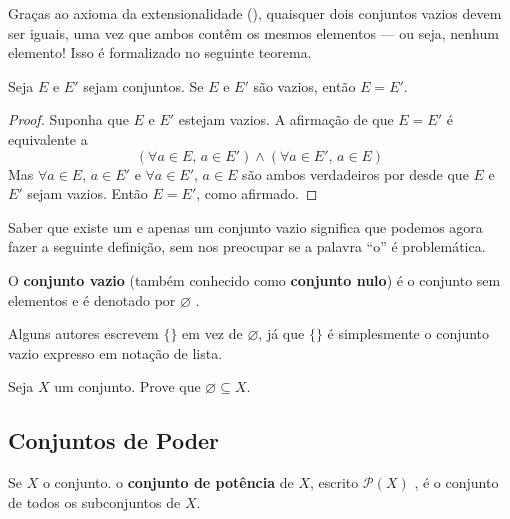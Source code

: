 Graças ao axioma da extensionalidade (), quaisquer dois conjuntos vazios devem ser iguais, uma vez que ambos contêm os mesmos elementos --- ou seja, nenhum elemento! Isso é formalizado no seguinte teorema.

\begin{theorem}
\label{thmEmptySetIsUnique}
Seja $E$ e $E'$ sejam conjuntos. Se $E$ e $E'$ são vazios, então $E=E'$.
\end{theorem}
\begin{proof}
Suponha que $E$ e $E'$ estejam vazios. A afirmação de que $E=E'$ é equivalente a
\[ (\forall a \in E,\, a \in E') \wedge (\forall a \in E',\, a \in E) \]
Mas $\forall a \in E,\, a \in E'$ e $\forall a \in E',\, a \in E$ são ambos verdadeiros por  desde que $E$ e $E'$ sejam vazios. Então $E=E'$, como afirmado.
\end{proof}

Saber que existe um e apenas um conjunto vazio significa que podemos agora fazer a seguinte definição, sem nos preocupar se a palavra “o” é problemática.

\begin{definition}
\label{defEmptySet}
O \textbf{conjunto vazio} (também conhecido como \textbf{conjunto nulo}) é o conjunto sem elementos e é denotado por $\varnothing$ .
\end{definition}

Alguns autores escrevem $\{ \}$ em vez de $\varnothing$, já que $\{ \}$ é simplesmente o conjunto vazio expresso em notação de lista.

\begin{exercise}
\label{exEmptySetSubsetOfEverySet}
Seja $X$ um conjunto. Prove que $\varnothing \subseteq X$.
\end{exercise}

\subsection*{Conjuntos de Poder}

\begin{definition}
\label{defPowerSet}
Se $X$ o conjunto. o \textbf{conjunto de potência} de $X$, escrito $\mathcal{P}(X)$ , é o conjunto de todos os subconjuntos de $X$.
\end{definition}

